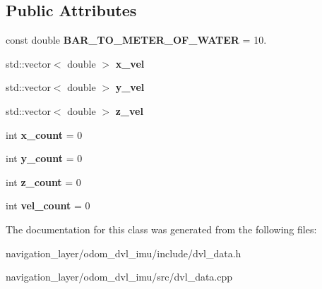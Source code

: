 \subsection*{Public Attributes}
\begin{DoxyCompactItemize}
\item 
\mbox{\label{classnavigation_1_1DvlData_a2f08082395e159bb9e15a67c55f194dd}} 
const double {\bfseries B\+A\+R\+\_\+\+T\+O\+\_\+\+M\+E\+T\+E\+R\+\_\+\+O\+F\+\_\+\+W\+A\+T\+ER} = 10.
\item 
\mbox{\label{classnavigation_1_1DvlData_a249ba705a7eecd0e3cfa38c3ac0aaecf}} 
std\+::vector$<$ double $>$ {\bfseries x\+\_\+vel}
\item 
\mbox{\label{classnavigation_1_1DvlData_a8e410bd105300614ceafe3a68c730c38}} 
std\+::vector$<$ double $>$ {\bfseries y\+\_\+vel}
\item 
\mbox{\label{classnavigation_1_1DvlData_a30ad7a24b1d21eda7751fb9b39b70bcf}} 
std\+::vector$<$ double $>$ {\bfseries z\+\_\+vel}
\item 
\mbox{\label{classnavigation_1_1DvlData_a489d885d8b0604f091e95829a7850c5f}} 
int {\bfseries x\+\_\+count} = 0
\item 
\mbox{\label{classnavigation_1_1DvlData_a5a4255a5ec33cb262f9b8f40d491b98a}} 
int {\bfseries y\+\_\+count} = 0
\item 
\mbox{\label{classnavigation_1_1DvlData_a0a4e7896e814db0a042529d8a16b50d3}} 
int {\bfseries z\+\_\+count} = 0
\item 
\mbox{\label{classnavigation_1_1DvlData_a4dd27495416fe948b07c4137574e0fed}} 
int {\bfseries vel\+\_\+count} = 0
\end{DoxyCompactItemize}


The documentation for this class was generated from the following files\+:\begin{DoxyCompactItemize}
\item 
navigation\+\_\+layer/odom\+\_\+dvl\+\_\+imu/include/dvl\+\_\+data.\+h\item 
navigation\+\_\+layer/odom\+\_\+dvl\+\_\+imu/src/dvl\+\_\+data.\+cpp\end{DoxyCompactItemize}
